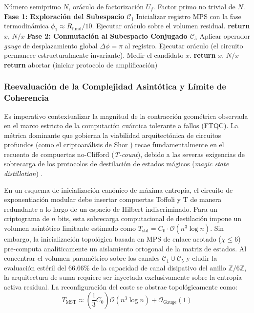 \documentclass[12pt,a4paper]{article}
\theoremstyle{plain}
\theoremstyle{definition}
\theoremstyle{remark}
\begin{document}
\begin{algorithm}[H]
\caption{Estrategia Adaptativa de Búsqueda Modular (MST)}
\label{alg:estrategia}
\begin{algorithmic}[1]
\Require Número semiprimo $N$, oráculo de factorización $U_f$.
\Ensure Factor primo no trivial de $N$.
\Statex
\State \textbf{Fase 1: Exploración del Subespacio $\mathcal{C}_1$}
\State Inicializar registro MPS con la fase termodinámica $\phi_1 \approx R_{\text{fund}}/10$.
\State Ejecutar oráculo sobre el volumen residual.
    \State \textbf{return} $x$, $N/x$
\EndIf
\Statex
\State \textbf{Fase 2: Conmutación al Subespacio Conjugado $\mathcal{C}_5$}
\State Aplicar operador \textit{gauge} de desplazamiento global $\Delta\phi = \pi$ al registro.
\State Ejecutar oráculo (el circuito permanece estructuralmente invariante).
\State Medir el candidato $x$.
    \State \textbf{return} $x$, $N/x$
\Else
    \State \textbf{return} abortar (iniciar protocolo de amplificación)
\EndIf
\end{algorithmic}
\end{algorithm}

\subsubsection*{Reevaluación de la Complejidad Asintótica y Límite de Coherencia}

Es imperativo contextualizar la magnitud de la contracción geométrica observada en el marco estricto de la computación cuántica tolerante a fallos (FTQC). La métrica dominante que gobierna la viabilidad arquitectónica de circuitos profundos (como el criptoanálisis de Shor \cite{Shor1994}) recae fundamentalmente en el recuento de compuertas no-Clifford (\textit{T-count}), debido a las severas exigencias de sobrecarga de los protocolos de destilación de estados mágicos (\textit{magic state distillation}) \cite{Gidney2021}.

En un esquema de inicialización canónico de máxima entropía, el circuito de exponentiación modular debe insertar compuertas Toffoli y T de manera redundante a lo largo de un espacio de Hilbert indiscriminado. Para un criptograma de $n$ bits, esta sobrecarga computacional de destilación impone un volumen asintótico limitante estimado como $T_{\text{std}} = C_0 \cdot \mathcal{O}(n^3 \log n)$. Sin embargo, la inicialización topológica basada en MPS de enlace acotado ($\chi \le 6$) pre-computa analíticamente un aislamiento ortogonal de la matriz de estados. Al concentrar el volumen paramétrico sobre los canales $\mathcal{C}_1 \cup \mathcal{C}_5$ y eludir la evaluación estéril del $66.66\%$ de la capacidad de canal disipativo del anillo $\mathbb{Z}/6\mathbb{Z}$, la arquitectura de suma requiere ser inyectada exclusivamente sobre la entropía activa residual. La reconfiguración del coste se abstrae topológicamente como:
\begin{equation}
T_{\text{MST}} \approx \left(\frac{1}{3} C_0 \right) \mathcal{O}(n^3 \log n) + \mathcal{O}_{\text{Gauge}}(1)
\label{eq:toffoli_reduction}
\end{equation}
\end{document}

